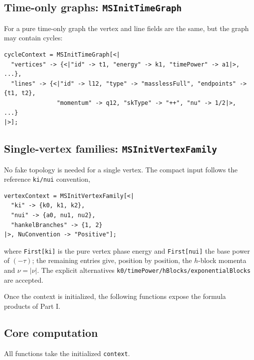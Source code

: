 \documentclass[11pt,a4paper]{article}
\begin{document}
\subsection{Time-only graphs: \texttt{MSInitTimeGraph}}

For a pure time-only graph the vertex and line fields are the same, but the graph may contain
cycles:
\begin{verbatim}
cycleContext = MSInitTimeGraph[<|
  "vertices" -> {<|"id" -> t1, "energy" -> k1, "timePower" -> a1|>, ...},
  "lines" -> {<|"id" -> l12, "type" -> "masslessFull", "endpoints" -> {t1, t2},
               "momentum" -> q12, "skType" -> "++", "nu" -> 1/2|>, ...}
|>];
\end{verbatim}

\subsection{Single-vertex families: \texttt{MSInitVertexFamily}}

No fake topology is needed for a single vertex. The compact input follows the reference
\texttt{ki/nui} convention,
\begin{verbatim}
vertexContext = MSInitVertexFamily[<|
  "ki" -> {k0, k1, k2},
  "nui" -> {a0, nu1, nu2},
  "hankelBranches" -> {1, 2}
|>, NuConvention -> "Positive"];
\end{verbatim}
where \texttt{First[ki]} is the pure vertex phase energy and \texttt{First[nui]} the base power of
$(-\tau)$; the remaining entries give, position by position, the $h$-block momenta and
$\nu=|\nu|$. The explicit alternatives \texttt{k0/timePower/hBlocks/exponentialBlocks} are
accepted.

Once the context is initialized, the following functions expose the formula products of Part I.

\subsection{Core computation}
\label{sec:core}

All functions take the initialized \texttt{context}.
\end{document}
